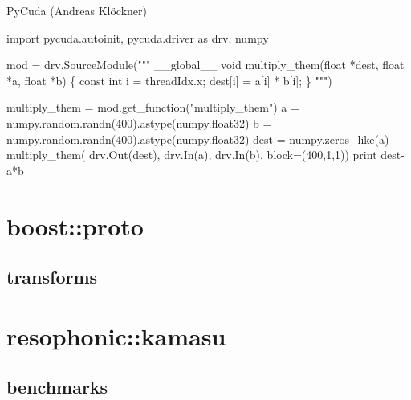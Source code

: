 \documentclass[10pt]{beamer}
\begin{document}
\begin{frame}[fragile]{PyCuda (Andreas Kl\"ockner)}
  \begin{semiverbatim}import pycuda.autoinit, pycuda.driver as drv, numpy

mod = drv.SourceModule("""
__global__ void multiply_them(float *dest, float *a, float *b)
\{
  const int i = threadIdx.x;
  dest[i] = a[i] * b[i];
\}
""")

multiply_them = mod.get_function("multiply_them")
a = numpy.random.randn(400).astype(numpy.float32)
b = numpy.random.randn(400).astype(numpy.float32)
dest = numpy.zeros_like(a)
multiply_them(
    drv.Out(dest), drv.In(a), drv.In(b),
    block=(400,1,1))
print dest-a*b
  \end{semiverbatim}


\end{frame}

\section{boost::proto}
\subsection{transforms}

\section{resophonic::kamasu}
\subsection{benchmarks}
\end{document}
